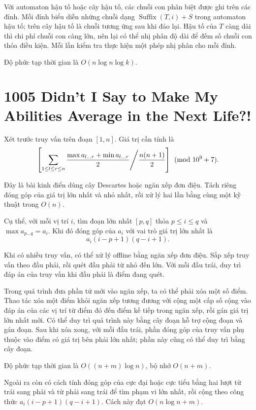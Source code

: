 \documentclass[11pt]{article}
\begin{document}
Với automaton hậu tố hoặc cây hậu tố, các chuỗi con phân biệt được ghi trên
các đỉnh. Mỗi đỉnh biểu diễn những chuỗi dạng $\operatorname{Suffix}(T,i)+S$
trong automaton hậu tố; trên cây hậu tố là chuỗi tương ứng sau khi đảo lại.
Hậu tố của $T$ càng dài thì chi phí chuỗi con càng lớn, nên lại có thể nhị
phân độ dài để đếm số chuỗi con thỏa điều kiện. Mỗi lần kiểm tra thực hiện
một phép nhị phân cho mỗi đỉnh.

Độ phức tạp thời gian là $O(n\log n\log k)$.

\section{1005 Didn't I Say to Make My Abilities Average in the Next Life?!}

Xét trước truy vấn trên đoạn $[1,n]$. Giá trị cần tính là
\[
  \left[
  \sum_{1\le l\le r\le n}
  \frac{\max a_{l\ldots r}+\min a_{l\ldots r}}{2}
  \middle/
  \frac{n(n+1)}{2}
  \right]
  \pmod{10^9+7}.
\]

Đây là bài kinh điển dùng cây Descartes hoặc ngăn xếp đơn điệu. Tách riêng
đóng góp của giá trị lớn nhất và nhỏ nhất, rồi xử lý hai lần bằng cùng một
kỹ thuật trong $O(n)$.

Cụ thể, với mỗi vị trí $i$, tìm đoạn lớn nhất $[p,q]$ thỏa
$p\le i\le q$ và $\max a_{p\ldots q}=a_i$. Khi đó đóng góp của $a_i$ với vai
trò giá trị lớn nhất là
\[
  a_i(i-p+1)(q-i+1).
\]

Khi có nhiều truy vấn, có thể xử lý offline bằng ngăn xếp đơn điệu. Sắp xếp
truy vấn theo đầu phải, rồi quét đầu phải từ nhỏ đến lớn. Với mỗi đầu trái,
duy trì đáp án của truy vấn khi đầu phải là điểm đang quét.

Trong quá trình đưa phần tử mới vào ngăn xếp, ta có thể phải xóa một số điểm.
Thao tác xóa một điểm khỏi ngăn xếp tương đương với cộng một cấp số cộng vào
đáp án của các vị trí từ điểm đó đến điểm kế tiếp trong ngăn xếp, rồi gán giá
trị lớn nhất mới. Có thể duy trì quá trình này bằng cây đoạn hỗ trợ cộng đoạn
và gán đoạn. Sau khi xóa xong, với mỗi đầu trái, phần đóng góp của truy vấn
phụ thuộc vào điểm có giá trị bên phải lớn nhất; phần này cũng có thể duy trì
bằng cây đoạn.

Độ phức tạp thời gian là $O((n+m)\log n)$, bộ nhớ $O(n+m)$.

Ngoài ra còn có cách tính đóng góp của cực đại hoặc cực tiểu bằng hai lượt từ
trái sang phải và từ phải sang trái để tìm phạm vi lớn nhất, rồi cộng theo
công thức $a_i(i-p+1)(q-i+1)$. Cách này đạt $O(n\log n+m)$.
\end{document}
